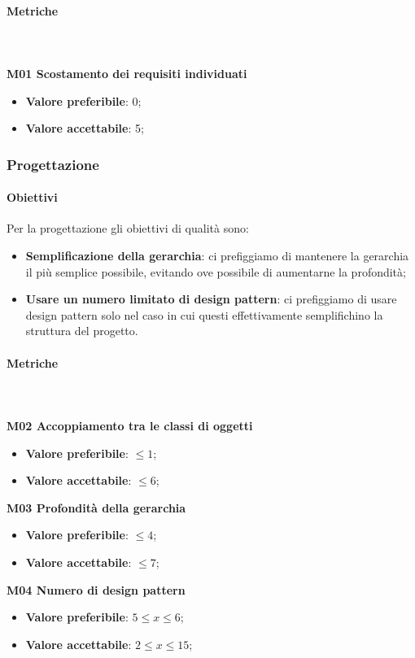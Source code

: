 			\paragraph{Metriche} \mbox{} \\ \\
				\textbf{M01 Scostamento dei requisiti individuati} 
				\begin{itemize}
					\item \textbf{Valore preferibile}: 0;
					\item \textbf{Valore accettabile}: 5;
				\end{itemize}
			
		\subsubsection{Progettazione}
			\paragraph{Obiettivi}
			 Per la progettazione gli obiettivi di qualità sono:
			 \begin{itemize}
			 	\item \textbf{Semplificazione della gerarchia}: ci prefiggiamo di mantenere la gerarchia il più semplice possibile, evitando ove possibile di aumentarne la profondità;
			 	\item \textbf{Usare un numero limitato di design pattern}: ci prefiggiamo di usare design pattern solo nel caso in cui questi effettivamente semplifichino la struttura del progetto.
			 \end{itemize}
			\paragraph{Metriche} \mbox{} \\ \\
				\textbf{M02 Accoppiamento tra le classi di oggetti} 
				\begin{itemize}
					\item \textbf{Valore preferibile}: $\le 1$;
					\item \textbf{Valore accettabile}: $\le 6$;
				\end{itemize}
				\textbf{M03 Profondità della gerarchia} 
				\begin{itemize}
					\item \textbf{Valore preferibile}: $\le 4$;
					\item \textbf{Valore accettabile}: $\le 7$;
				\end{itemize}			
				\textbf{M04 Numero di design pattern} 
				\begin{itemize}
					\item \textbf{Valore preferibile}: $5 \le x \le 6$; 
					\item \textbf{Valore accettabile}: $2 \le x \le 15$; 
				\end{itemize}
			
